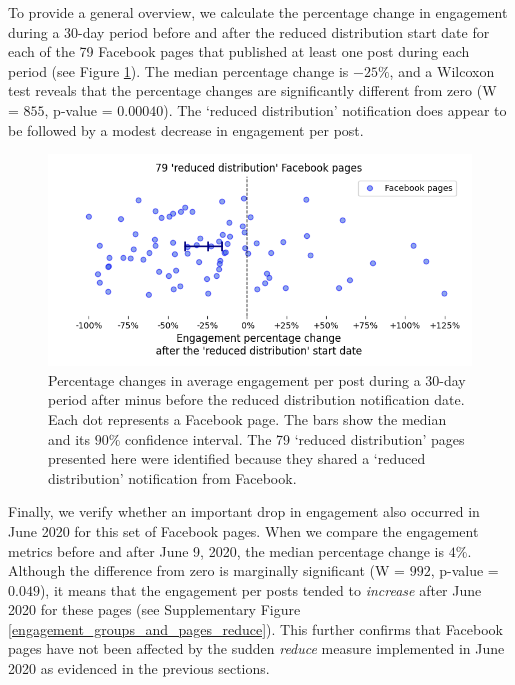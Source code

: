\documentclass[review]{elsarticle}
\begin{document}
{{To provide a general overview, we calculate the percentage change in engagement during a 30-day period before and after the reduced distribution start date for each of the 79 Facebook pages that published at least one post during each period (see Figure \ref{reduce_percentage_change}).
The median percentage change is $-25\%$, and a Wilcoxon test reveals that the percentage changes are significantly different from zero (W = $855$, p-value = $0.00040$).
The `reduced distribution' notification does appear to be followed by a modest decrease in engagement per post.

\begin{figure}[!h]
\centering
\includegraphics[scale=0.5]{./../figure/reduce_percentage_change.png}
\caption{
Percentage changes in average engagement per post during a 30-day period after minus before the reduced distribution notification date.
Each dot represents a Facebook page. 
The bars show the median and its $90\%$ confidence interval.
The 79 `reduced distribution' pages presented here were identified because they shared a `reduced distribution' notification from Facebook.
}
\label{reduce_percentage_change}
\end{figure}
 
Finally, we verify whether an important drop in engagement also occurred in June 2020 for this set of Facebook pages.
When we compare the engagement metrics before and after June 9, 2020, the median percentage change is $4\%$. Although the difference from zero is marginally significant (W = $992$, p-value = $0.049$), it means that the engagement per posts tended to {\it increase} after June 2020 for these pages (see Supplementary Figure \ref{engagement_groups_and_pages_reduce}).
This further confirms that Facebook pages have not been affected by the sudden {\it reduce} measure implemented in June 2020 as evidenced in the previous sections.

}}
\end{document}
